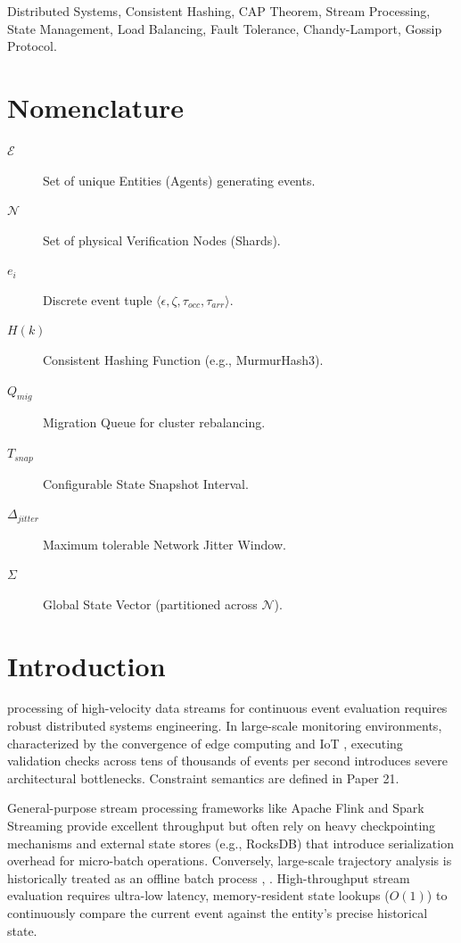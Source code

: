 \documentclass[conference]{IEEEtran}
\begin{document}
\begin{IEEEkeywords}
Distributed Systems, Consistent Hashing, CAP Theorem, Stream Processing, State Management, Load Balancing, Fault Tolerance, Chandy-Lamport, Gossip Protocol.
\end{IEEEkeywords}

\section*{Nomenclature}
\begin{description}
    \item[$\mathcal{E}$] Set of unique Entities (Agents) generating events.
    \item[$\mathcal{N}$] Set of physical Verification Nodes (Shards).
    \item[$e_i$] Discrete event tuple $\langle \epsilon, \zeta, \tau_{occ}, \tau_{arr} \rangle$.
    \item[$H(k)$] Consistent Hashing Function (e.g., MurmurHash3).
    \item[$Q_{mig}$] Migration Queue for cluster rebalancing.
    \item[$T_{snap}$] Configurable State Snapshot Interval.
    \item[$\Delta_{jitter}$] Maximum tolerable Network Jitter Window.
    \item[$\Sigma$] Global State Vector (partitioned across $\mathcal{N}$).
\end{description}

\section{Introduction}
 processing of high-velocity data streams for continuous event evaluation requires robust distributed systems engineering. In large-scale monitoring environments, characterized by the convergence of edge computing and IoT \cite{b11}, executing validation checks across tens of thousands of events per second introduces severe architectural bottlenecks. Constraint semantics are defined in Paper 21. 

General-purpose stream processing frameworks like Apache Flink \cite{b1} and Spark Streaming \cite{b14} provide excellent throughput but often rely on heavy checkpointing mechanisms and external state stores (e.g., RocksDB) that introduce serialization overhead for micro-batch operations. Conversely, large-scale trajectory analysis is historically treated as an offline batch process \cite{b15}, \cite{b16}. High-throughput stream evaluation requires ultra-low latency, memory-resident state lookups ($O(1)$) to continuously compare the current event against the entity's precise historical state. 
\end{document}
